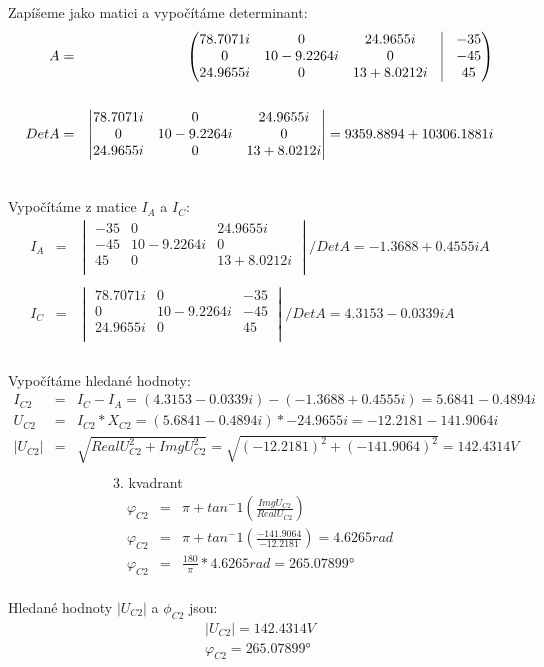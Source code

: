 Zapíšeme jako matici a vypočítáme determinant:
    \begin{eqnarray*}
        A &= &
			\begin{pmatrix}			
				78.7071i & 0 & 24.9655i & \vline & -35\\
				0 & 10 - 9.2264i & 0 & \vline & -45\\
				24.9655i & 0 & 13 + 8.0212i & \vline & 45\\
			\end{pmatrix} \\
		\\
		Det A &= &
			\begin{vmatrix}
				78.7071i & 0 & 24.9655i\\
				0 & 10 - 9.2264i & 0\\
				24.9655i & 0 & 13 + 8.0212i \\
			\end{vmatrix} = 9359.8894 + 10306.1881i\\
		\\
	\end{eqnarray*}

Vypočítáme z matice $I_{A}$ a $I_{C}$:
    \begin{eqnarray*}
        I_{A} &= &
			\begin{vmatrix}
				-35 & 0 & 24.9655i\\
				-45 & 10 - 9.2264i & 0\\
				45 & 0 & 13 + 8.0212i\\
			\end{vmatrix} / Det A = - 1.3688 + 0.4555i A\\
		\\
		I_{C} &= &
			\begin{vmatrix}
				78.7071i & 0 & -35\\
				0 & 10 - 9.2264i & -45\\
				24.9655i & 0 & 45\\
			\end{vmatrix} / Det A = 4.3153 - 0.0339i A\\
		\\
	\end{eqnarray*}

Vypočítáme hledané hodnoty:
    \begin{eqnarray*}
        I_{C2} &= & I_{C} - I_{A} = (4.3153 - 0.0339i) - (- 1.3688 + 0.4555i) = 5.6841 - 0.4894i\\
        U_{C2} &= & I_{C2} * X_{C2} = (5.6841 - 0.4894i) * - 24.9655i = - 12.2181 - 141.9064i\\
        |U_{C2}| &= & \sqrt{RealU_{C2}^2 + ImgU_{C2}^2} = \sqrt{(-12.2181)^2 + (-141.9064)^2} = 142.4314 V\\
        \end{eqnarray*}
               3. kvadrant
    \begin{eqnarray*}
        \varphi_{C2} &= & \pi + tan^-1(\frac{ImgU_{C2}}{RealU_{C2}})\\
        \varphi_{C2} &= & \pi +  tan^-1(\frac{-141.9064}{-12.2181}) = 4.6265 rad\\
        \varphi_{C2} &= & \frac{180}{\pi} * 4.6265 rad = \ang{265.07899}\\
	\end{eqnarray*}

Hledané hodnoty $|U_{C2}|$ a $\phi_{C2}$ jsou:
    \begin{eqnarray*}
        |U_{C2}| = 142.4314 V\\
        \varphi_{C2} = \ang{265.07899}\\
	\end{eqnarray*}